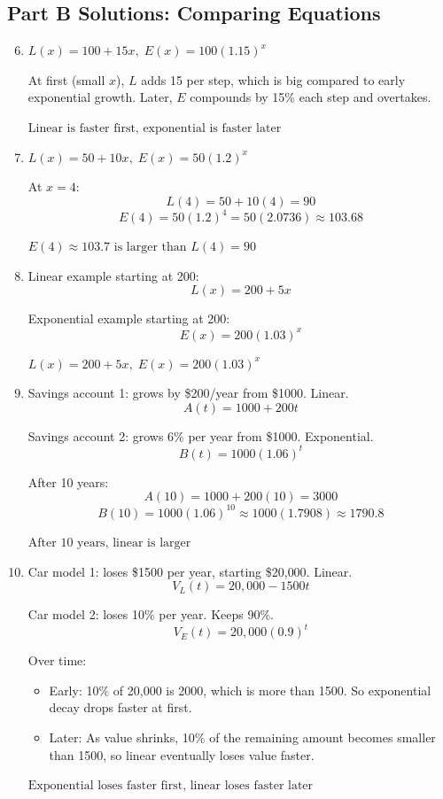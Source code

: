 \documentclass[14pt]{extarticle}
\begin{document}
\subsection*{Part B Solutions: Comparing Equations}
\begin{enumerate}
  \setcounter{enumi}{5}
  \item \(L(x) = 100 + 15x,\; E(x) = 100(1.15)^x\)

  At first (small \(x\)), \(L\) adds 15 per step, which is big compared to early exponential growth.  
  Later, \(E\) compounds by 15\% each step and overtakes.

  \(\boxed{\text{Linear is faster first, exponential is faster later}}\)

  \item \(L(x) = 50 + 10x,\; E(x) = 50(1.2)^x\)

  At \(x = 4\):
  \[
  L(4) = 50 + 10(4) = 90
  \]
  \[
  E(4) = 50(1.2)^4 = 50(2.0736) \approx 103.68
  \]

  \(\boxed{E(4) \approx 103.7 \text{ is larger than } L(4)=90}\)

  \item Linear example starting at 200:  
  \[
  L(x) = 200 + 5x
  \]

    
  Exponential example starting at 200:  
  \[
  E(x) = 200(1.03)^x
  \]


  \(\boxed{L(x)=200+5x,\; E(x)=200(1.03)^x}\)

  \item Savings account 1: grows by \$200/year from \$1000. Linear.
  \[
  A(t) = 1000 + 200t
  \]

  Savings account 2: grows 6\% per year from \$1000. Exponential.
  \[
  B(t) = 1000(1.06)^t
  \]

  After 10 years:
  \[
  A(10) = 1000 + 200(10) = 3000
  \]
  \[
  B(10) = 1000(1.06)^{10} \approx 1000(1.7908) \approx 1790.8
  \]

  \(\boxed{\text{After 10 years, linear is larger}}\)

  \item Car model 1: loses \$1500 per year, starting \$20{,}000. Linear.
  \[
  V_L(t) = 20{,}000 - 1500t
  \]

  Car model 2: loses 10\% per year. Keeps 90\%.
  \[
  V_E(t) = 20{,}000(0.9)^t
  \]

  Over time:
  \begin{itemize}
    \item Early: 10\% of 20{,}000 is 2000, which is more than 1500. So exponential decay drops faster at first.
    \item Later: As value shrinks, 10\% of the remaining amount becomes smaller than 1500, so linear eventually loses value faster.
  \end{itemize}

  \(\boxed{\text{Exponential loses faster first, linear loses faster later}}\)
\end{enumerate}
\end{document}
